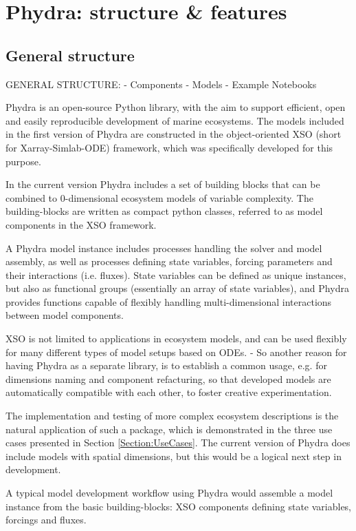 \documentclass[journal abbreviation, manuscript]{copernicus}
\begin{document}
\section{Phydra: structure \& features} \label{Section:phydrapackage}

\subsection{General structure}
GENERAL STRUCTURE:
- Components
- Models
- Example Notebooks


Phydra is an open-source Python library, with the aim to support efficient, open and easily reproducible development of marine ecosystems. The models included in the first version of Phydra are constructed in the object-oriented XSO (short for Xarray-Simlab-ODE) framework, which was specifically developed for this purpose. 

In the current version Phydra includes a set of building blocks that can be combined to 0-dimensional ecosystem models of variable complexity. 
The building-blocks are written as compact python classes, referred to as model components in the XSO framework.

A Phydra model instance includes processes handling the solver and model assembly, as well as processes defining state variables, forcing parameters and their interactions (i.e. fluxes). State variables can be defined as unique instances, but also as functional groups (essentially an array of state variables), and Phydra provides functions capable of flexibly handling multi-dimensional interactions between model components. 

XSO is not limited to applications in ecosystem models, and can be used flexibly for many different types of model setups based on ODEs. 
- So another reason for having Phydra as a separate library, is to establish a common usage, e.g. for dimensions naming and component refacturing, so that developed models are automatically compatible with each other, to foster creative experimentation.

The implementation and testing of more complex ecosystem descriptions is the natural application of such a package, which is demonstrated in the three use cases presented in Section \ref{Section:UseCases}. The current version of Phydra does include models with spatial dimensions, but this would be a logical next step in development.

A typical model development workflow using Phydra would assemble a model instance from the basic building-blocks: XSO components defining state variables, forcings and fluxes. 
\end{document}
